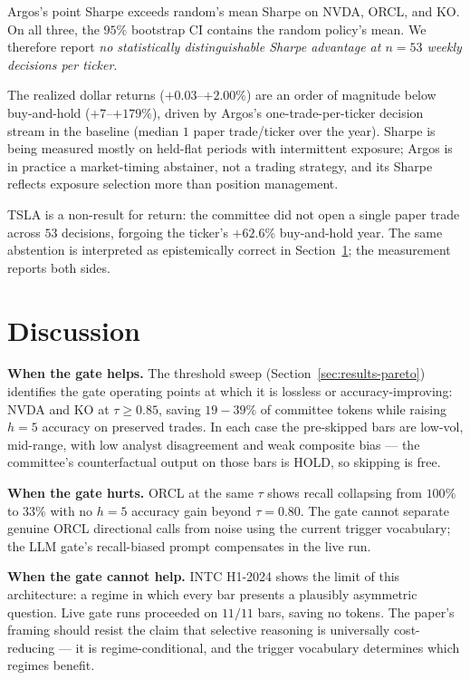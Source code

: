 \documentclass[conference]{IEEEtran}
\begin{document}
Argos's point Sharpe exceeds random's mean Sharpe on NVDA, ORCL, and
KO. On all three, the $95\%$ bootstrap CI contains the random
policy's mean. We therefore report \emph{no statistically
distinguishable Sharpe advantage at $n{=}53$ weekly decisions per
ticker}.

The realized dollar returns ($+0.03$--$+2.00\%$) are an order of
magnitude below buy-and-hold ($+7$--$+179\%$), driven by Argos's
one-trade-per-ticker decision stream in the baseline (median $1$
paper trade/ticker over the year). Sharpe is being measured mostly
on held-flat periods with intermittent exposure; Argos is in
practice a market-timing abstainer, not a trading strategy, and its
Sharpe reflects exposure selection more than position management.

TSLA is a non-result for return: the committee did not open a single
paper trade across $53$ decisions, forgoing the ticker's $+62.6\%$
buy-and-hold year. The same abstention is interpreted as
epistemically correct in Section~\ref{sec:discussion}; the
measurement reports both sides.

\section{Discussion}
\label{sec:discussion}

\textbf{When the gate helps.}
The threshold sweep (Section~\ref{sec:results-pareto}) identifies the
gate operating points at which it is lossless or
accuracy-improving: NVDA and KO at $\tau{\geq}0.85$, saving
$19{-}39\%$ of committee tokens while raising $h{=}5$ accuracy on
preserved trades. In each case the pre-skipped bars are low-vol,
mid-range, with low analyst disagreement and weak composite bias
--- the committee's counterfactual output on those bars is HOLD, so
skipping is free.

\textbf{When the gate hurts.}
ORCL at the same $\tau$ shows recall collapsing from $100\%$ to
$33\%$ with no $h{=}5$ accuracy gain beyond $\tau{=}0.80$. The gate
cannot separate genuine ORCL directional calls from noise using the
current trigger vocabulary; the LLM gate's recall-biased prompt
compensates in the live run.

\textbf{When the gate cannot help.}
INTC H1-2024 shows the limit of this architecture: a regime in which
every bar presents a plausibly asymmetric question. Live gate runs
proceeded on $11/11$ bars, saving no tokens. The paper's framing
should resist the claim that selective reasoning is universally
cost-reducing --- it is regime-conditional, and the trigger
vocabulary determines which regimes benefit.
\end{document}
